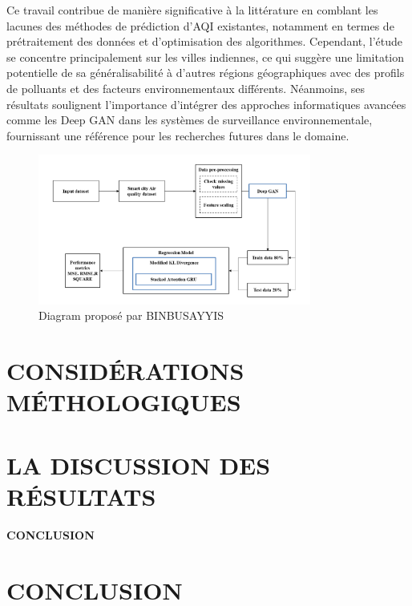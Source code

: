 \documentclass[12pt,a4paper]{report}
\begin{document}
Ce travail contribue de manière significative à la littérature en comblant les lacunes des méthodes de prédiction d'AQI existantes, notamment en termes de prétraitement des données et d'optimisation des algorithmes. Cependant, l'étude se concentre principalement sur les villes indiennes, ce qui suggère une limitation potentielle de sa généralisabilité à d'autres régions géographiques avec des profils de polluants et des facteurs environnementaux différents. Néanmoins, ses résultats soulignent l'importance d'intégrer des approches informatiques avancées comme les Deep GAN dans les systèmes de surveillance environnementale, fournissant une référence pour les recherches futures dans le domaine.

\begin{figure}[h]
    \centering
    \includegraphics[width=0.8\textwidth]{diagram1.png}
    \caption{Diagram proposé par BINBUSAYYIS}
    \label{fig:Pollution}
\end{figure}

\chapter{CONSIDÉRATIONS MÉTHOLOGIQUES}
\lipsum[1-2]

\chapter{LA DISCUSSION DES RÉSULTATS}
\lipsum[3-4]

\newpage
\thispagestyle{empty}
\begin{center}
\vspace*{\fill}
{\Huge\textbf{CONCLUSION}}
\vspace*{\fill}
\end{center}

\chapter{CONCLUSION}
\lipsum[5-6]
\end{document}
